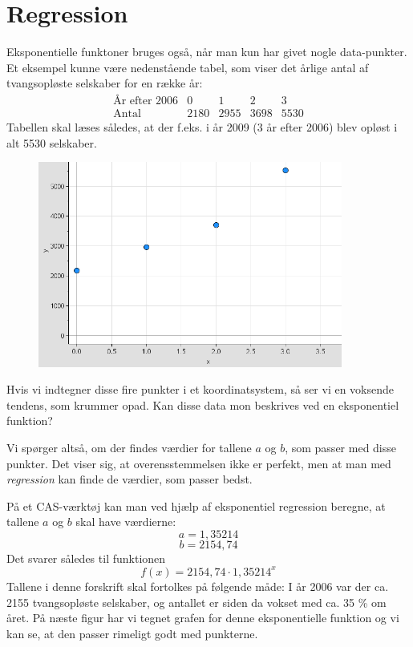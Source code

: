 \documentclass[12pt,oneside,a4paper]{article}
\theoremstyle{plain}
\begin{document}
\section*{Regression}
Eksponentielle funktoner bruges også, når man kun har givet nogle
data-punkter. Et eksempel kunne være nedenstående tabel, som viser det årlige
antal af tvangsopløste selskaber for en række år:
$$
\begin{array}{l|c|c|c|c}
    \mbox{År efter 2006} & 0 & 1 & 2 & 3 \\
    \hline
    \mbox{Antal} & 2180 & 2955 & 3698 & 5530
\end{array}
$$
Tabellen skal læses således, at der f.eks. i år 2009 (3 år efter 2006) blev
opløst i alt 5530 selskaber.

\begin{figure}[ht]
    \centering
    \includegraphics[width=10cm]{eksp-eks1}
\end{figure}

Hvis vi indtegner disse fire punkter i et koordinatsystem, så ser vi en
voksende tendens, som krummer opad. Kan disse data mon beskrives ved en
eksponentiel funktion?

Vi spørger altså, om der findes værdier for tallene $a$ og $b$, som passer med
disse punkter. Det viser sig, at overensstemmelsen ikke er perfekt, men at man
med {\em regression} kan finde de værdier, som passer bedst.

På et CAS-værktøj kan man ved hjælp af eksponentiel regression beregne, at
tallene $a$ og $b$ skal have værdierne: 
$$
a = 1,35214
$$
$$
b = 2154,74
$$
Det svarer således til funktionen 
$$
f(x) = 2154,74 \cdot 1,35214 ^x
$$
Tallene i denne forskrift skal fortolkes på følgende måde: I år 2006 var der
ca. 2155 tvangsopløste selskaber, og antallet er siden da vokset med ca. 35 \%
om året.  På næste figur har vi tegnet grafen for denne eksponentielle funktion
og vi kan se, at den passer rimeligt godt med punkterne.
\end{document}

